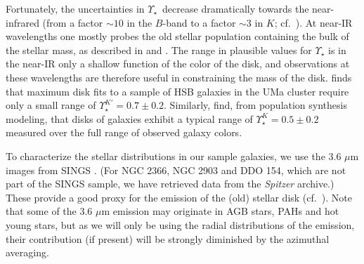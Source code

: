\documentclass[usenatbib,usegraphicx,apjfonts,floatfix]{emulateapj}
\newcommand{\MLstar}{\ensuremath{\Upsilon_{\star}}}
\begin{document}
Fortunately, the uncertainties in \MLstar\ decrease dramatically
towards the near-infrared (from a factor $\sim 10$ in the $B$-band to
a factor $\sim 3$ in $K$; cf.\ \citealt{bell_dejong}).  At near-IR
wavelengths one mostly probes the old stellar population containing
the bulk of the stellar mass, as described in \citet{bell_dejong} and
\citet{verheijen_phd}. The range in plausible values for
$\Upsilon_{\star}$ is in the near-IR only a shallow function of the
color of the disk, and observations at these wavelengths are therefore
useful in constraining the mass of the disk. \citet{verheijen_phd}
finds that maximum disk fits to a sample of HSB galaxies in the UMa
cluster require only a small range of $\Upsilon_{\star}^{K'} = 0.7 \pm
0.2$. Similarly, \citet{bell_dejong} find, from population synthesis
modeling, that disks of galaxies exhibit a typical range of
$\Upsilon_{\star}^K = 0.5 \pm 0.2$ measured over the full range of
observed galaxy colors.

To characterize the stellar distributions in our sample galaxies, we
use the 3.6 $\mu$m images from SINGS \citep{sings}. (For NGC 2366, NGC
2903 and DDO 154, which are not part of the SINGS sample, we have
retrieved data from the \emph{Spitzer} archive.) These provide a good
proxy for the emission of the (old) stellar disk (cf.\ \citealt{pahre2004}).
Note that some of the 3.6 $\mu$m emission may originate in AGB stars,
PAHs and hot young stars, but as we will only be using the radial
distributions of the emission, their contribution (if present) will be
strongly diminished by the azimuthal averaging.
\end{document}

